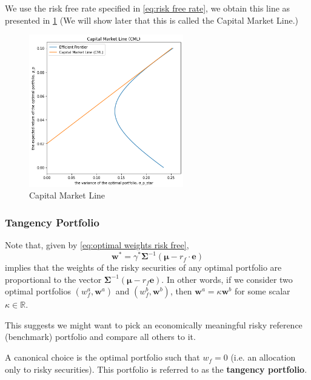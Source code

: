 \documentclass[13pt]{article}
\theoremstyle{definition}
\theoremstyle{remark}
\begin{document}
We use the risk free rate specified in \cref{eq:risk free rate}, we obtain this line as presented in \cref{fig:Capital Market Line} (We will show later that this is called the Capital Market Line.)
\begin{figure}[!htp]
    \centering
    \includegraphics[width=0.6\textwidth]{Capital Market Line.png}
    \caption{Capital Market Line}
    \label{fig:Capital Market Line}
\end{figure}

\subsubsection{Tangency Portfolio}
{\color{C6}
    Note that, given by \cref{eq:optimal weights risk free},
$$
\bm{w}^*=\gamma^* \mathbf{\Sigma}^{-1}\left(\bm{\mu}-r_{f} \cdot \bm{e}\right)
$$
implies that the weights of the risky securities of any optimal portfolio are proportional to the vector $\mathbf{\Sigma}^{-1}\left(\bm{\mu}-r_{f} \bm{e}\right)$. In other words, if we consider two optimal portfolios $\left(w_{f}^a, \bm{w}^a\right)$ and $\left(w_{f}^b, \bm{w}^b\right)$, then $\bm{w}^{a}=\kappa \bm{w}^{b}$ for some scalar $\kappa\in \mathbb{R}$.

This suggests we might want to pick an economically meaningful risky reference (benchmark) portfolio and compare all others to it.}

A canonical choice is the optimal portfolio such that $w_f=0$ (i.e. an allocation only to risky securities). This portfolio is referred to as the \textbf{tangency portfolio}.
\end{document}
